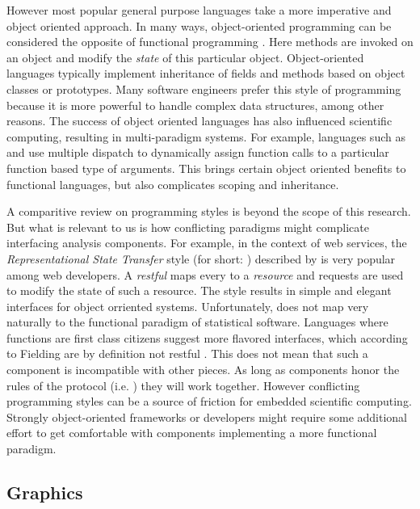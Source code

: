 However most popular general purpose languages take a more imperative and object oriented approach. In many ways, object-oriented programming can be considered the opposite of functional programming \citep{pythonfunctional}. Here methods are invoked on an object and modify the \emph{state} of this particular object. Object-oriented languages typically implement inheritance of fields and methods based on object classes or prototypes. Many software engineers prefer this style of programming because it is more powerful to handle complex data structures, among other reasons. The success of object oriented languages has also influenced scientific computing, resulting in multi-paradigm systems. For example, languages such as \Julia and \R use multiple dispatch to dynamically assign function calls to a particular function based type of arguments. This brings certain object oriented benefits to functional languages, but also complicates scoping and inheritance. 

A comparitive review on programming styles is beyond the scope of this research. But what is relevant to us is how conflicting paradigms might complicate interfacing analysis components. For example, in the context of web services, the \emph{Representational State Transfer} style (for short: \REST) described by \cite{fielding2000architectural} is very popular among web developers. A \emph{restful} \API maps every \URL to a \emph{resource} and \HTTP requests are used to modify the state of such a resource. The \REST style results in simple and elegant \HTTP interfaces for object orriented systems. Unfortunately, \REST does not map very naturally to the functional paradigm of statistical software. Languages where functions are first class citizens suggest more \RPC flavored interfaces, which according to Fielding are by definition not restful \citep{fielding2008rest}. This does not mean that such a component is incompatible with other pieces. As long as components honor the rules of the protocol (i.e. \HTTP) they will work together. However conflicting programming styles can be a source of friction for embedded scientific computing. Strongly object-oriented frameworks or developers might require some additional effort to get comfortable with components implementing a more functional paradigm.



\subsection{Graphics}

